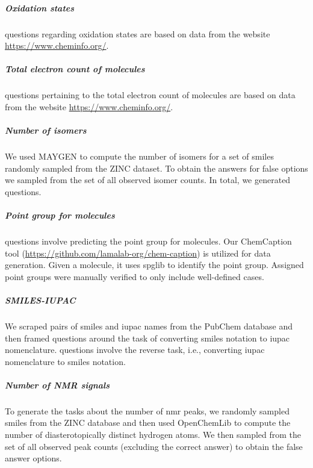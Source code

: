 \documentclass[11pt, oneside]{article}
\begin{document}
\begin{refsection}
\subparagraph{Oxidation states}
 questions regarding oxidation states are based on data from the website \url{https://www.cheminfo.org/}. 

\subparagraph{Total electron count of molecules}
 questions pertaining to the total electron count of molecules are based on data from the website \url{https://www.cheminfo.org/}. 

\subparagraph{Number of isomers}
We used MAYGEN\autocite{Yirik_2021} to compute the number of isomers for a set of  \gls{smiles} randomly sampled from the ZINC dataset.\autocite{Irwin_2012}
To obtain the answers for false options we sampled from the set of all observed isomer counts. In total, we generated  questions.

\subparagraph{Point group for molecules}
 questions involve predicting the point group for molecules. Our ChemCaption tool (\url{https://github.com/lamalab-org/chem-caption}) is utilized for data generation. 
Given a molecule, it uses spglib\autocite{spglib} to identify the point group. 
Assigned point groups were manually verified to only include well-defined cases.

\subparagraph{SMILES-IUPAC}
We scraped pairs of \gls{smiles} and \gls{iupac} names from the PubChem database \autocite{pubchem} and then framed  questions around the task of converting \gls{smiles} notation to \gls{iupac} nomenclature.
 questions involve the reverse task, i.e., converting \gls{iupac} nomenclature to \gls{smiles} notation.


\subparagraph{Number of NMR signals} 
To generate the   tasks about the number of \gls{nmr} peaks, we randomly sampled \gls{smiles} from the ZINC database\autocite{Irwin_2012} and then used OpenChemLib\autocite{openchemlib} to compute the number of diasterotopically distinct hydrogen atoms. 
We then sampled from the set of all observed peak counts (excluding the correct answer) to obtain the false answer options.


\end{refsection}
\end{document}
